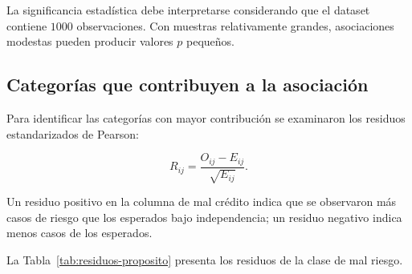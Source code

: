 La significancia estadística debe interpretarse considerando que el
dataset contiene \(1000\) observaciones. Con muestras relativamente
grandes, asociaciones modestas pueden producir valores \(p\) pequeños.

\subsection{Categorías que contribuyen a la asociación}

Para identificar las categorías con mayor contribución se examinaron los
residuos estandarizados de Pearson:

\[
R_{ij}
=
\frac{
    O_{ij}-E_{ij}
}{
    \sqrt{E_{ij}}
}.
\]

Un residuo positivo en la columna de mal crédito indica que se observaron
más casos de riesgo que los esperados bajo independencia; un residuo
negativo indica menos casos de los esperados.

La Tabla~\ref{tab:residuos-proposito} presenta los residuos de la clase
de mal riesgo.

